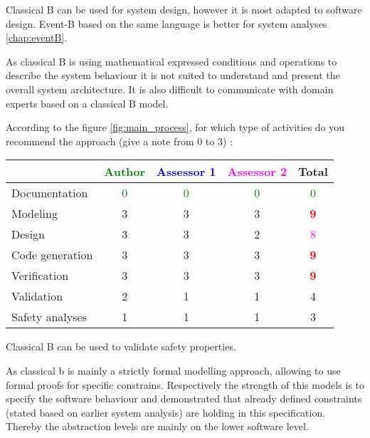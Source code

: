 \begin{author_comment}
Classical B can be used for system design, however it is most adapted to software design. Event-B  based on the same language is better for system analyses \ref{chap:eventB}.
\end{author_comment}


\begin{assessor2}
As classical B is using mathematical expressed conditions and operations to describe the system behaviour it is not suited to understand and present the overall system architecture. It is also difficult to communicate with domain experts based on a classical B model.
\end{assessor2}

According to the figure \ref{fig:main_process}, for which type of activities do you recommend the approach (give a note from 0 to  3) :

\begin{tabular}{|l | c | c | c | c|}
\hline
& \textcolor{green}{Author} & \textcolor{blue}{Assessor 1} & \textcolor{magenta}{Assessor 2} & Total \\
\hline 
Documentation & \textcolor{green}{0} & \textcolor{green}{0} & \textcolor{green}{0} & \textcolor{green}{0} \\
\hline
Modeling & 3     & 3     & 3     & \textcolor{red}{\textbf{9}} \\
\hline
Design & 3     & 3     & 2     & \textcolor{magenta}{8} \\
\hline
Code generation & 3     & 3     & 3     & \textcolor{red}{\textbf{9}} \\
\hline
Verification & 3     & 3     & 3     & \textcolor{red}{\textbf{9}} \\
\hline
Validation & 2     & 1     & 1     & 4     \\
\hline
Safety analyses & 1     & 1     & 1     & 3     \\
\hline
\end{tabular}


\begin{author_comment}
Classical B  can be used to  validate safety properties.
\end{author_comment}

\begin{assessor2}
As classical b is mainly a strictly formal modelling approach, allowing to use formal proofs for specific constrains. Respectively the strength of this models is to specify the software behaviour and demonstrated that already defined constraints (stated based on earlier system analysis) are holding in this specification. Thereby the abstraction levels are mainly on the lower software level.
\end{assessor2}

